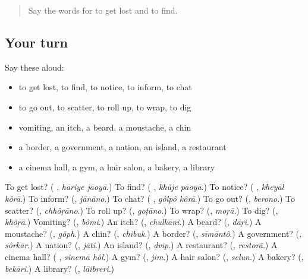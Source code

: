 \label{lesson:BN-R245-second-pass-words-from-chapters-241-245}



\begin{quote}
Say the words for to get lost and to find.
\end{quote}

\subsection*{Your turn}
Say these aloud:

\begin{itemize}
\raggedright
  \item to get lost, to find, to notice, to inform, to chat
  \item to go out, to scatter, to roll up, to wrap, to dig
  \item vomiting, an itch, a beard, a moustache, a chin
  \item a border, a government, a nation, an island, a restaurant
  \item a cinema hall, a gym, a hair salon, a bakery, a library
\end{itemize}

\begin{tcolorbox}[breakable,colback=teal!4,colframe=teal!35!black,title={Before you move on}]
To get lost? (\textbf{ }, \emph{hāriye jāoyā}.) To find? (\textbf{ }, \emph{khũje pāoyā}.) To notice? (\textbf{ }, \emph{kheyāl kôrā}.) To inform? (\textbf{}, \emph{jānāno}.) To chat? (\textbf{ }, \emph{gôlpô kôrā}.) To go out? (\textbf{}, \emph{berono}.) To scatter? (\textbf{}, \emph{chhôṛāno}.) To roll up? (\textbf{}, \emph{goṭāno}.) To wrap? (\textbf{}, \emph{moṛā}.) To dig? (\textbf{}, \emph{khõṛā}.) Vomiting? (\textbf{}, \emph{bômi}.) An itch? (\textbf{}, \emph{chulkāni}.) A beard? (\textbf{}, \emph{dāṛi}.) A moustache? (\textbf{}, \emph{gõph}.) A chin? (\textbf{}, \emph{chibuk}.) A border? (\textbf{}, \emph{sīmāntô}.) A government? (\textbf{}, \emph{sôrkār}.) A nation? (\textbf{}, \emph{jāti}.) An island? (\textbf{}, \emph{dvīp}.) A restaurant? (\textbf{}, \emph{restorā̃}.) A cinema hall? (\textbf{ }, \emph{sinemā hôl}.) A gym? (\textbf{}, \emph{jim}.) A hair salon? (\textbf{}, \emph{selun}.) A bakery? (\textbf{}, \emph{bekāri}.) A library? (\textbf{}, \emph{lāibreri}.)
\end{tcolorbox}
